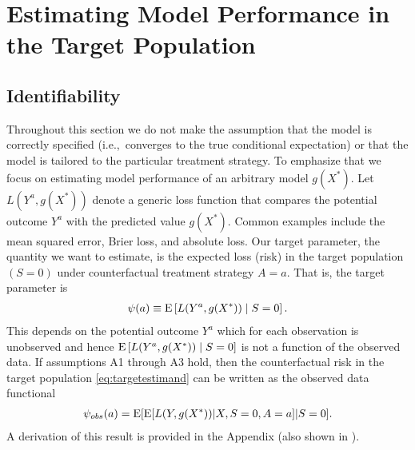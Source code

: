 \documentclass[11pt]{article}
\DeclareMathOperator{\E}{\textnormal{\mbox{E}}}
\begin{document}


\section*{Estimating Model Performance in the Target Population}


\subsection*{Identifiability}

Throughout this section we do not make the assumption that the model is correctly specified (i.e.,~converges to the true conditional expectation) or that the model is tailored to the particular treatment strategy. To emphasize that we focus on estimating model performance of an arbitrary model $g(X^*)$. Let $L(Y^a, g(X^*))$ denote a generic loss function that compares the potential outcome $Y^a$ with the predicted value $g(X^*)$. Common examples include the mean squared error, Brier loss, and absolute loss. Our target parameter, the quantity we want to estimate, is the expected loss (risk) in the target population $(S=0)$ under counterfactual treatment strategy $A =a$. That is, the target parameter is
\begin{align}
    \psi(a) \equiv \E \left[L(Y^a, g(X^*)) \mid S=0\right]. \label{eq:targetestimand}
\end{align}
This depends on the potential outcome $Y^a$ which for each observation is unobserved and hence $\E\left[L(Y^a, g(X^*)) \mid S=0\right]$ is not a function of the observed data. If assumptions A1 through A3 hold, then the counterfactual risk in the target population \eqref{eq:targetestimand} can be written as the observed data functional
\begin{align}
    \psi_{obs}(a) = \E[ \E[ L(Y, g(X^*)) |X, S=0, A=a] |S=0].\label{eq:withintarget}
\end{align}
A derivation of this result is provided in the Appendix (also shown in \cite{boyer2023new}).
\end{document}
